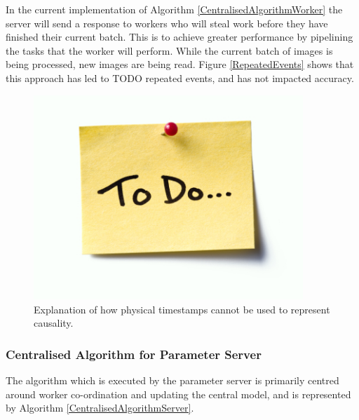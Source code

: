 \documentclass[12pt]{article}
\begin{document}
\newline
\newline
In the current implementation of Algorithm \ref{CentralisedAlgorithmWorker} the server will send a response to workers who will steal work before they have finished their current batch. This is to achieve greater performance by pipelining the tasks that the worker will perform. While the current batch of images is being processed, new images are being read. Figure \ref{RepeatedEvents} shows that this approach has led to TODO repeated events, and has not impacted accuracy.

\begin{figure}[H]
  \centering
  \includegraphics[width=4in]{todo}
  \caption[]{Explanation of how physical timestamps cannot be used to represent causality.}
  \label{awaitResponse}
\end{figure}

\subsubsection{Centralised Algorithm for Parameter Server}

The algorithm which is executed by the parameter server is primarily centred around worker co-ordination and updating the central model, and is represented by Algorithm \ref{CentralisedAlgorithmServer}.
\end{document}
